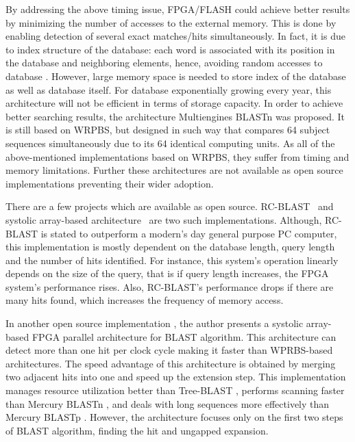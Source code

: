        
By addressing the above timing issue, FPGA/FLASH \cite{lavenier2007reconfigurable} could achieve better results by minimizing the number of accesses to the external memory. 
This is done by enabling detection of several exact matches/hits simultaneously. 
In fact, it is due to index structure of the database: each word is associated with its position in the database and neighboring elements, hence, avoiding random accesses to database \cite{guo2012systolic}. 
However, large memory space is needed to store index of the database as well as database itself. 
For database exponentially growing every year, this architecture will not be efficient in terms of storage capacity. 
In order to achieve better searching results, the architecture Multiengines BLASTn \cite{sotiriades2007design} was proposed. 
It is still based on WRPBS, but designed in such way that compares 64 subject sequences simultaneously due to its 64 identical computing units. 
As all of the above-mentioned implementations based on WRPBS, they suffer from timing and memory limitations. 
Further these architectures are not available as open source implementations preventing their wider adoption.

There are a few projects which are available as open source. 
RC-BLAST~\cite{datta2009} and  systolic array-based architecture~\cite{guo2012open} are two such implementations.
Although, RC-BLAST is stated to outperform a modern's day general purpose PC computer, this implementation is mostly dependent on the database length, query length and the number of hits identified. 
For instance, this system's operation linearly depends on the size of the query, that is if query length increases, the FPGA system's performance rises. 
Also, RC-BLAST's performance drops if there are many hits found, which increases the frequency of memory access.

In another open source implementation \cite{guo2012open}, the author presents a systolic array-based FPGA parallel architecture for BLAST algorithm. 
This architecture can detect more than one hit per clock cycle making it faster than WPRBS-based architectures. 
The speed advantage of this architecture is obtained by merging two adjacent hits into one and speed up the extension step. 
This implementation manages resource utilization better than Tree-BLAST \cite{herbordt2006single}, performs scanning faster than Mercury BLASTn \cite{buhler2007mercury}, and deals with long sequences more effectively than Mercury BLASTp \cite{harris2007banded}. 
However, the architecture focuses only on the first two steps of BLAST algorithm, finding the hit and ungapped expansion. 

